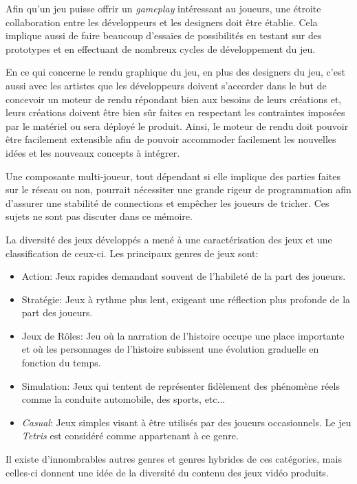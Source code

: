 \documentclass[12pt,oneside,letterpaper,francais]{book}
\begin{document}
Afin qu'un jeu puisse offrir un \textit{gameplay} intéressant au
joueurs, une étroite collaboration entre les développeurs et les
designers doit être établie. Cela implique aussi de faire beaucoup
d'essaies de possibilités en testant sur des prototypes et en
effectuant de nombreux cycles de développement du jeu.

En ce qui concerne le rendu graphique du jeu, en plus des designers du
jeu, c'est aussi avec les artistes que les développeurs doivent
s'accorder dans le but de concevoir un moteur de rendu répondant bien
aux besoins de leurs créations et, leurs créations doivent être bien
sûr faites en respectant les contraintes imposées par le matériel ou
sera déployé le produit. Ainsi, le moteur de rendu doit pouvoir être
facilement extensible afin de pouvoir accommoder facilement les
nouvelles idées et les nouveaux concepts à intégrer.

Une composante multi-joueur, tout dépendant si elle implique des
parties faites sur le réseau ou non, pourrait nécessiter une grande
rigeur de programmation afin d'assurer une stabilité de connections et
empêcher les joueurs de tricher. Ces sujets ne sont pas discuter dans
ce mémoire.

La diversité des jeux développés a mené à une caractérisation des jeux
et une classification de ceux-ci. Les principaux genres de jeux sont:

\begin{itemize}
\item Action: Jeux rapides demandant souvent de l'habileté de la part
  des joueurs.
\item Stratégie: Jeux à rythme plus lent, exigeant une réflection plus
  profonde de la part des joueurs.
\item Jeux de Rôles: Jeu où la narration de l'histoire occupe une
  place importante et où les personnages de l'histoire subissent une
  évolution graduelle en fonction du temps.
\item Simulation: Jeux qui tentent de représenter fidèlement des
  phénomène réels comme la conduite automobile, des sports, etc...
\item \textit{Casual}: Jeux simples visant à être utilisés par des
  joueurs occasionnels. Le jeu \textit{Tetris} est considéré comme
  appartenant à ce genre.
\end{itemize}

Il existe d'innombrables autres genres et genres hybrides de ces
catégories, mais celles-ci donnent une idée de la diversité du contenu
des jeux vidéo produits.
\end{document}
